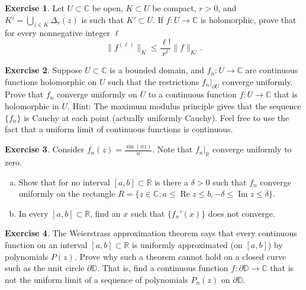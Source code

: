 \documentclass[12pt,openany]{book}
\newcommand{\widebar}[1]{\overline{#1}}
\renewcommand{\Re}{\operatorname{Re}}
\renewcommand{\Im}{\operatorname{Im}}
\newcommand{\snorm}[1]{\lVert {#1} \rVert}
\newcommand{\C}{{\mathbb{C}}}
\newcommand{\R}{{\mathbb{R}}}
\newcommand{\D}{{\mathbb{D}}}
\theoremstyle{plain}
\theoremstyle{remark}
\theoremstyle{definition}
\newenvironment{exbox}{%
    \def\FrameCommand{\vrule width 1pt \relax\hspace{10pt}}%
    \MakeFramed{\advance\hsize-\width\FrameRestore}%
}{%
    \endMakeFramed
}
\newenvironment{exparts}{%
    \leavevmode\begin{enumerate}[a),noitemsep,topsep=0pt,parsep=0pt,partopsep=0pt]
}{%
    \end{enumerate}
}
\theoremstyle{exercise}
\newtheorem{exercise}{Exercise}[section]
\theoremstyle{example}
\begin{document}
\begin{exbox}
\begin{exercise}
Let $U \subset \C$ be open, $K \subset U$ be compact, $r > 0$, and
$K' = \bigcup_{z\in K} \overline{\Delta_r(z)}$
is such that $K' \subset U$.  If $f \colon U \to \C$ is holomorphic,
prove that for every nonnegative integer $\ell$
\begin{equation*}
\snorm{f^{(\ell)}}_{K}
\leq
\frac{\ell!}{r^\ell}
\snorm{f}_{K'} .
\end{equation*}
\end{exercise}

\begin{exercise} \label{exercise:convergeboundary}
Suppose $U \subset \C$ is a bounded domain, and $f_n \colon \widebar{U} \to
\C$ are continuous functions holomorphic on $U$ such that
the restrictions $f_n|_{\partial U}$ converge uniformly.  Prove that
$f_n$ converge uniformly on $\widebar{U}$ to a continuous
function $f \colon \widebar{U} \to \C$ that is holomorphic in $U$.
Hint: The maximum modulus principle gives that the sequence
$\{ f_n \}$
is Cauchy at each point (actually uniformly Cauchy).  Feel free to use the
fact that a uniform limit of continuous functions is continuous.
\end{exercise}

\begin{exercise}
Consider $f_n(z) = \frac{\sin(nz)}{n}$.  Note that $f_n|_{\R}$ converge
uniformly to zero.
\begin{exparts}
\item
Show that for no interval $[a,b] \subset \R$ is there a $\delta > 0$ such that
$f_n$ converge uniformly on the rectangle $R = \bigl\{ z \in \C : a \leq \Re z
\leq b , -\delta \leq \Im z \leq \delta \bigr\}$.
\item
In every $[a,b] \subset \R$, find 
an $x$ such that $\{ f_n'(x) \}$ does not converge.
\end{exparts}
\end{exercise}

\begin{exercise}
\pagebreak[2]
The Weierstrass approximation theorem says that every continuous function on an
interval $[a,b] \subset \R$ is uniformly approximated (on $[a,b]$) by
polynomials $P(z)$.  Prove why such a theorem cannot hold
on a closed curve such as the unit circle $\partial \D$.  That is,
find a continuous function $f \colon \partial \D \to \C$ that is
not the uniform limit of a sequence of polynomials $P_n(z)$ on $\partial \D$.
\end{exercise}


\end{exbox}
\end{document}
